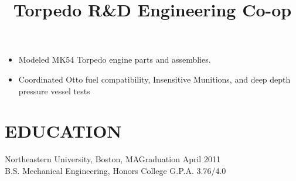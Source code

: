 \documentclass[line]{res}
\begin{document}
\begin{resume}
\title{Torpedo R\&D Engineering Co-op}
\begin {position}
\vspace {-10 pt}
\begin{itemize}
\item Modeled MK54 Torpedo engine parts and assemblies.
\item Coordinated Otto fuel compatibility, Insensitive Munitions, and deep depth pressure vessel tests
\end{itemize}
\end{position}

\section{EDUCATION}
Northeastern University, Boston, MA\hfill Graduation April 2011 \\
B.S. Mechanical Engineering, Honors College \hfill G.P.A. 3.76/4.0 \

\end{resume}
\end{document}
